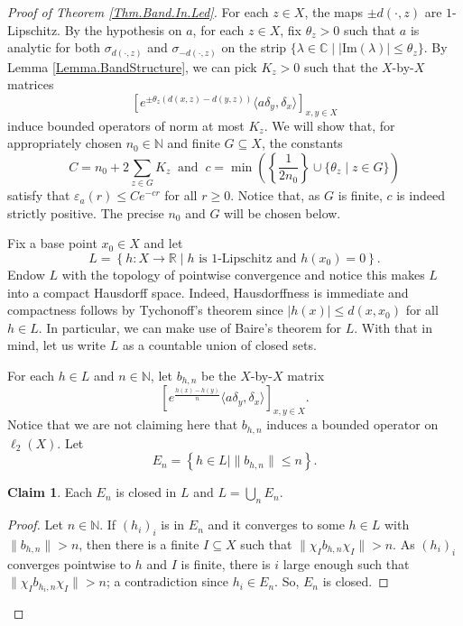 \documentclass[11pt]{amsart}
\newcommand{\R}{\mathbb{R}}
\newcommand{\N}{\mathbb{N}}
\newcommand{\C}{\mathbb{C}}
\newcommand{\eps}{\varepsilon}
\numberwithin{equation}{section}
\theoremstyle{definition}
\newtheorem{claim}[theorem]{Claim}
\theoremstyle{remark}
\begin{document}
\begin{proof}[Proof of Theorem \ref{Thm.Band.In.Led}]
For each $z\in X$, the maps $\pm d(\cdot ,z)$ are $1$-Lipschitz. By the hypothesis on $a$, for each $z\in X$, fix $\theta_z>0$ such that $a$ is analytic for both $\sigma_{  d(\cdot ,z)}$ and $\sigma_{-d(\cdot ,z)}$ on the strip $\{\lambda\in \C\mid |\mathrm{Im}(\lambda)|\leq \theta_z\}$. By Lemma \ref{Lemma.BandStructure}, we can pick $K_z>0$ such that the $X$-by-$X$ matrices
\[\left[e^{\pm\theta_z( d(x,z)-d(y,z))}\langle a\delta_{y},\delta_{x}\rangle\right]_{x,y\in X}\]
induce bounded operators of norm at most $K_z$. We will show that, for  appropriately chosen $n_0\in\N$ and finite   $G\subseteq X$, the constants
\begin{equation}\label{Eq.C.c.bwb.pedro}C=n_0+2\sum_{z\in G}K_z\ \text{ and }\ c=\min\left(\left\{\frac{1}{2n_0}\right\}\cup\{\theta_z\mid z\in G\}\right)\end{equation} satisfy that   $\eps_a(r)\leq Ce^{-cr}$ for all $r\geq 0$. Notice that, as $G$ is finite, $c$ is indeed strictly positive. The precise $n_0$ and $G$ will be chosen below.

Fix a base point $x_0\in X$ and let
\[L=\left\{h\colon X\to\R\mid h\text{ is $1$-Lipschitz and }h(x_0)=0\right\}.\]
Endow $L$ with the topology of pointwise convergence and notice this makes $L$ into a compact Hausdorff space. Indeed, Hausdorffness  is immediate and compactness follows by Tychonoff's theorem since $|h(x)|\leq d(x,x_0)$ for all $h\in L$. In particular, we can make use of Baire's theorem  for $L$. With that in mind, let us write $L$ as a countable union of closed sets.

 For each $h\in L$ and $n\in\N$, let $b_{h,n}$ be the $X$-by-$X$ matrix
\[\left[e^{\frac{h(x)-h(y)}{n}}\langle a\delta_y,\delta_x\rangle\right]_{x,y\in X}.\]
Notice that we are not claiming here that $b_{h,n}$ induces a bounded operator on $\ell_2(X)$. Let
\[E_n=\left\{h\in L\mid \|b_{h,n}\|\leq  n\right\}.\]

\begin{claim}
    Each $E_n$ is closed in $L$ and $L=\bigcup_nE_n$.
\end{claim}


\begin{proof}
Let $n\in\N$. If $(h_i)_i$ is in $E_n$ and it converges to some $h\in L$ with $\|b_{h,n}\|>n$, then there is a finite $I\subseteq X$ such that      $\|\chi_Ib_{h,n}\chi_I\|>n$. As $(h_i)_i$ converges pointwise to $h$ and $I$ is finite, there is $i$ large enough such that  $\|\chi_Ib_{h_i,n}\chi_I\|>n$; a contradiction since $h_i\in E_n$. So, $E_n$ is closed.


\end{proof}
\end{proof}
\end{document}
